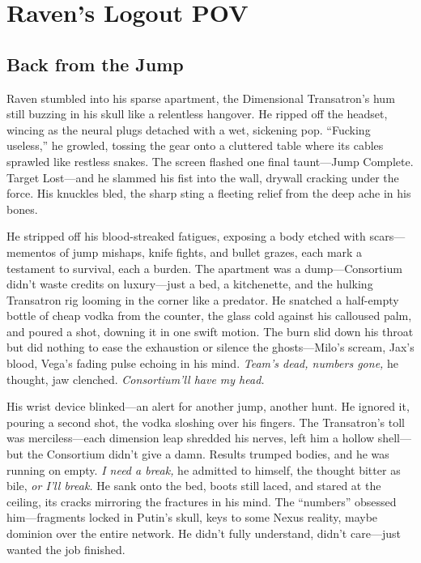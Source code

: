 \documentclass[12pt]{book}
\begin{document}
\chapter{Raven’s Logout POV}
\section{Back from the Jump}

Raven stumbled into his sparse apartment, the Dimensional Transatron’s hum still buzzing in his skull like a relentless hangover. He ripped off the headset, wincing as the neural plugs detached with a wet, sickening pop. ``Fucking useless,'' he growled, tossing the gear onto a cluttered table where its cables sprawled like restless snakes. The screen flashed one final taunt---Jump Complete. Target Lost---and he slammed his fist into the wall, drywall cracking under the force. His knuckles bled, the sharp sting a fleeting relief from the deep ache in his bones.

He stripped off his blood-streaked fatigues, exposing a body etched with scars---mementos of jump mishaps, knife fights, and bullet grazes, each mark a testament to survival, each a burden. The apartment was a dump---Consortium didn’t waste credits on luxury---just a bed, a kitchenette, and the hulking Transatron rig looming in the corner like a predator. He snatched a half-empty bottle of cheap vodka from the counter, the glass cold against his calloused palm, and poured a shot, downing it in one swift motion. The burn slid down his throat but did nothing to ease the exhaustion or silence the ghosts---Milo’s scream, Jax’s blood, Vega’s fading pulse echoing in his mind. \textit{Team’s dead, numbers gone,} he thought, jaw clenched. \textit{Consortium’ll have my head.}

His wrist device blinked---an alert for another jump, another hunt. He ignored it, pouring a second shot, the vodka sloshing over his fingers. The Transatron’s toll was merciless---each dimension leap shredded his nerves, left him a hollow shell---but the Consortium didn’t give a damn. Results trumped bodies, and he was running on empty. \textit{I need a break,} he admitted to himself, the thought bitter as bile, \textit{or I’ll break.} He sank onto the bed, boots still laced, and stared at the ceiling, its cracks mirroring the fractures in his mind. The ``numbers'' obsessed him---fragments locked in Putin’s skull, keys to some Nexus reality, maybe dominion over the entire network. He didn’t fully understand, didn’t care---just wanted the job finished.
\end{document}

